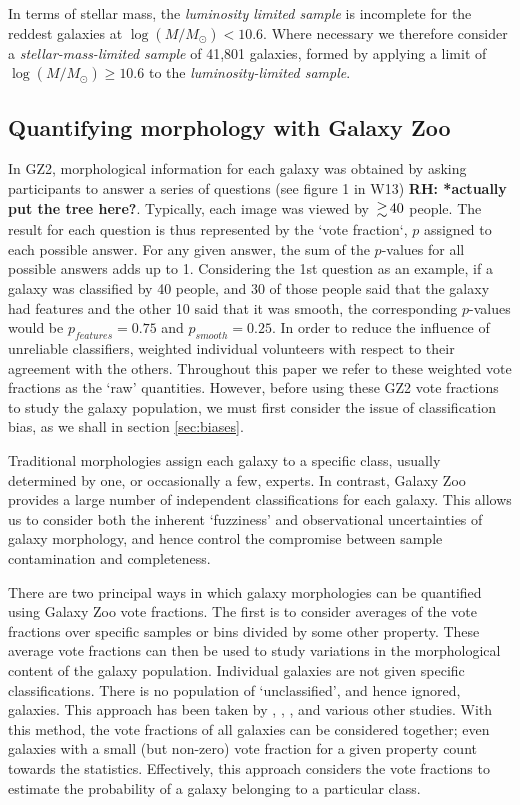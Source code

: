 \documentclass[useAMS,usenatbib]{mn2e}
\newcommand{\rh}[1]{{\bf \textcolor{RoyalPurple}{RH: #1}}}
\begin{document}
In terms of stellar mass, the \textit{luminosity limited sample} is incomplete for the reddest galaxies at $\log (M/M_{\odot}) < 10.6$. Where necessary we therefore consider a \textit{stellar-mass-limited sample} of 41,801 galaxies, formed by applying a limit of $\log (M/M_{\odot}) \geq 10.6$ to the \textit{luminosity-limited sample}.


\subsection{Quantifying morphology with Galaxy Zoo}
\label{sec:gz_morphologies}

In GZ2, morphological information for each galaxy was obtained by asking participants to answer a series of questions (see figure 1 in W13) \rh{*actually put the tree here?}.  Typically, each image was viewed by $\ga 40$ people.  The result for each question is thus represented by the `vote fraction`, $p$ assigned to each possible answer. For any given answer, the sum of the $p$-values for all possible answers adds up to 1. Considering the 1st question as an example, if a galaxy was classified by 40 people, and 30 of those people said that the galaxy had features and the other 10 said that it was smooth, the corresponding $p$-values would be $p_{features}=0.75$ and $p_{smooth}=0.25$.  In order to reduce the influence of unreliable classifiers, \citet{Willett_13} weighted individual volunteers with respect to their agreement with the others.  Throughout this paper we refer to these weighted vote fractions as the `raw' quantities. However, before using these GZ2 vote fractions to study the galaxy population, we must first consider the issue of classification bias, as we shall in section \ref{sec:biases}.

Traditional morphologies assign each galaxy to a specific class, usually determined by one, or occasionally a few, experts. In contrast, Galaxy Zoo provides a large number of independent classifications for each galaxy.  This allows us to consider both the inherent `fuzziness' and observational uncertainties of galaxy morphology, and hence control the compromise between sample contamination and completeness.

There are two principal ways in which galaxy morphologies can be quantified using Galaxy Zoo vote fractions. The first is to consider averages of the vote fractions over specific samples or bins divided by some other property.  These average vote fractions can then be used to study variations in the morphological content of the galaxy population.  Individual galaxies are not given specific classifications.  There is no population of `unclassified', and hence ignored, galaxies.  This approach has been taken by \citet{Bamford_09}, \citet{Casteels_13}, \citet{Willett_15}, and various other studies. With this method, the vote fractions of all galaxies can be considered together; even galaxies with a small (but non-zero) vote fraction for a given property count towards the statistics. Effectively, this approach considers the vote fractions to estimate the probability of a galaxy belonging to a particular class.
\end{document}
